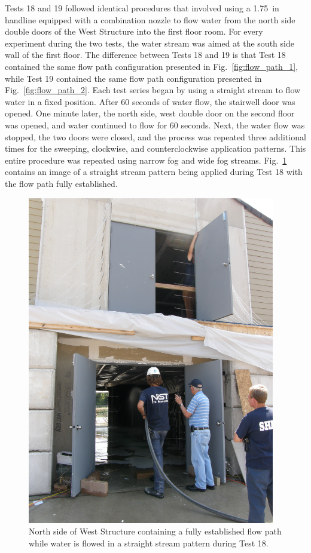 \documentclass[12pt,oneside]{book}
\begin{document}
Tests 18 and 19 followed identical procedures that involved using a 1.75~in handline equipped with a combination nozzle to flow water from the north side double doors of the West Structure into the first floor room. For every experiment during the two tests, the water stream was aimed at the south side wall of the first floor. The difference between Tests 18 and 19 is that Test 18 contained the same flow path configuration presented in Fig.~\ref{fig:flow_path_1}, while Test 19 contained the same flow path configuration presented in Fig.~\ref{fig:flow_path_2}. Each test series began by using a straight stream to flow water in a fixed position. After 60 seconds of water flow, the stairwell door was opened. One minute later, the north side, west double door on the second floor was opened, and water continued to flow for 60 seconds. Next, the water flow was stopped, the two doors were closed, and the process was repeated three additional times for the sweeping, clockwise, and counterclockwise application patterns. This entire procedure was repeated using narrow fog and wide fog streams. Fig.~\ref{fig:test_18_pic} contains an image of a straight stream pattern being applied during Test 18 with the flow path fully established.

\begin{figure}[!ht]
	\includegraphics[width=4.25in]{../Figures/Pictures/Test_18}
	\caption[North side of West Structure containing a fully established flow path during Test 18.]{North side of West Structure containing a fully established flow path while water is flowed in a straight stream pattern during Test 18.}
	\label{fig:test_18_pic}
\end{figure}
\FloatBarrier
\end{document}
